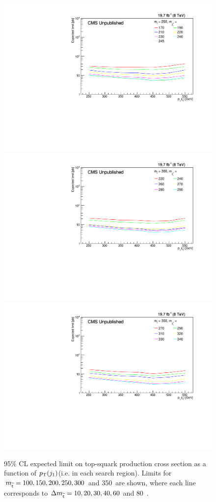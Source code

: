 \begin{figure}[!Ht]
\begin{center}
  \includegraphics[scale=0.35]{Figures/sus13009/limitplots/plots/stop/expected_250.pdf}
  \includegraphics[scale=0.35]{Figures/sus13009/limitplots/plots/stop/expected_300.pdf} 
  \includegraphics[scale=0.35]{Figures/sus13009/limitplots/plots/stop/expected_350.pdf}  
  \caption{95\% CL expected limit on top-squark production cross section as a function of $p_{\text{T}}(j_{1})$\GeV (i.e. in each search region). Limits for $m_{\widetilde{{\rm t}}}=100,150,200,250,300$ and 350~\GeV are shown, where each line corresponds to $\Delta m_{\widetilde{{\rm t}}}=10,20,30,40,60$ and 80~\GeV.}
  \label{fig:expLimStop}
  \end{center}
\end{figure}

